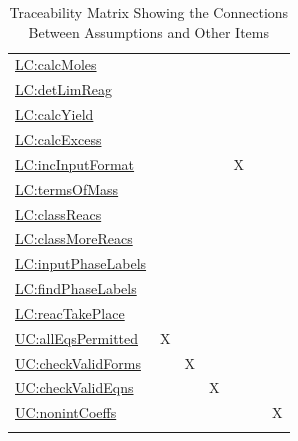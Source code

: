 \documentclass[12pt]{article}
\begin{document}
\begin{longtable}{l l l l l l l}
\hyperref[calcMoles]{LC:calcMoles} &  &  &  &  &  & 
\\
\hyperref[detLimReag]{LC:detLimReag} &  &  &  &  &  & 
\\
\hyperref[calcYield]{LC:calcYield} &  &  &  &  &  & 
\\
\hyperref[calcExcess]{LC:calcExcess} &  &  &  &  &  & 
\\
\hyperref[incInputFormat]{LC:incInputFormat} &  &  &  & X &  & 
\\
\hyperref[termsOfMass]{LC:termsOfMass} &  &  &  &  &  & 
\\
\hyperref[classReacs]{LC:classReacs} &  &  &  &  &  & 
\\
\hyperref[classMoreReacs]{LC:classMoreReacs} &  &  &  &  &  & 
\\
\hyperref[inputPhaseLabels]{LC:inputPhaseLabels} &  &  &  &  &  & 
\\
\hyperref[findPhaseLabels]{LC:findPhaseLabels} &  &  &  &  &  & 
\\
\hyperref[reacTakePlace]{LC:reacTakePlace} &  &  &  &  &  & 
\\
\hyperref[allEqsPermitted]{UC:allEqsPermitted} & X &  &  &  &  & 
\\
\hyperref[checkValidForms]{UC:checkValidForms} &  & X &  &  &  & 
\\
\hyperref[checkValidEqns]{UC:checkValidEqns} &  &  & X &  &  & 
\\
\hyperref[nonintCoeffs]{UC:nonintCoeffs} &  &  &  &  &  & X
\\
\bottomrule
\caption{Traceability Matrix Showing the Connections Between Assumptions and Other Items}
\label{Table:TraceMatAvsAll}
\end{longtable}
\end{document}
